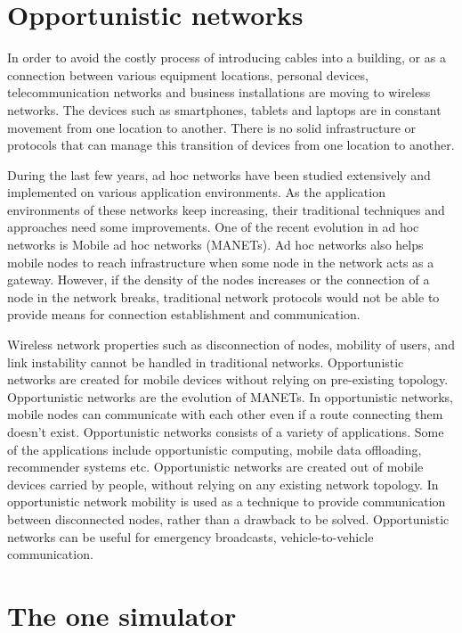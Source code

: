 \documentclass[conference]{IEEEtran}
\begin{document}
\section{Opportunistic networks}

In order to avoid the costly process of introducing cables into a building, or as a connection between various equipment locations, personal devices, telecommunication networks and business installations are moving to wireless networks. The devices such as smartphones, tablets and laptops are in constant movement from one location to another. There is no solid infrastructure or protocols that can manage this transition of devices from one location to another.

During the last few years, ad hoc networks have been studied extensively and implemented on various application environments. As the application environments of these networks keep increasing, their traditional techniques and approaches need some improvements. One of the recent evolution in ad hoc networks is Mobile ad hoc networks (MANETs). Ad hoc networks also helps mobile nodes to reach infrastructure when some node in the network acts as a gateway. However, if the density of the nodes increases or the connection of a node in the network breaks, traditional network protocols would not be able to provide means for connection establishment and communication.

Wireless network properties such as disconnection of nodes, mobility of users, and link instability cannot be handled in traditional networks. Opportunistic networks are created for mobile devices without relying on pre-existing topology. Opportunistic networks are the evolution of MANETs. In opportunistic networks, mobile nodes can communicate with each other even if a route connecting them doesn’t exist. Opportunistic networks consists of a variety of applications. Some of the applications include opportunistic computing, mobile data offloading, recommender systems etc. Opportunistic networks are created out of mobile devices carried by people, without relying on any existing network topology. In opportunistic network mobility is used as a technique to provide communication between disconnected nodes, rather than a drawback to be solved. Opportunistic networks can be useful for emergency broadcasts, vehicle-to-vehicle communication.


\section{The one simulator}
\end{document}

